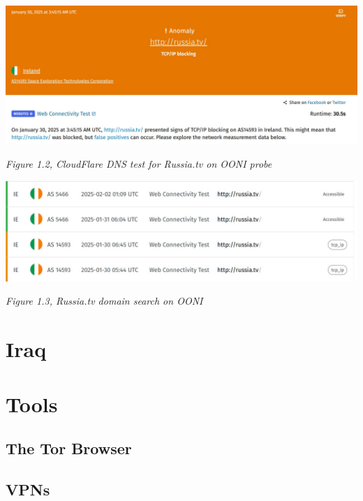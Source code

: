 \centerline{\includegraphics[width=480pt]{Griff/Latex/TCD SCSS CAPSTONE/Literature Review/CloudFlare Block Russiatv.jpg}}

\centerline{\textit{Figure 1.2, CloudFlare DNS test for Russia.tv on OONI probe}}

\centerline{\includegraphics[width=480pt]{Griff/Latex/TCD SCSS CAPSTONE/Literature Review/RussiaTV search OONI.jpg}}

\centerline{\textit{Figure 1.3, Russia.tv domain search on OONI}}

\section{Iraq}

\section{Tools}

\subsection{The Tor Browser}

\subsection{VPNs}

